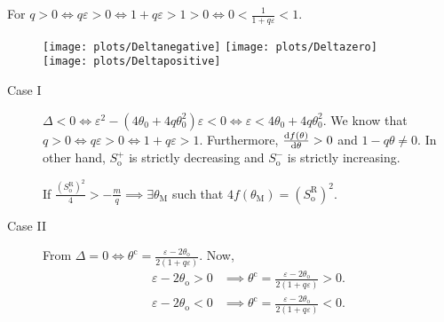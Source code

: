 \documentclass[
    8pt,
    aspectratio=1610,
    c,
    intlimits,
    leqno,
    professionalfonts,
]{beamer}
\begin{document}
\begin{frame}
	For
	\begin{math}
		q>0\iff
		q\varepsilon>0\iff
		1+q\varepsilon>1>0\iff
		0<\frac{1}{1+q\varepsilon}<1
	\end{math}.

	\begin{figure}[ht!]
		\centering
		\texttt{[image: plots/Deltanegative]}
		\texttt{[image: plots/Deltazero]}
		\texttt{[image: plots/Deltapositive]}
	\end{figure}

	\begin{description}
		\item[Case I]
		      \begin{math}
			      \Delta<0\iff
			      \varepsilon^{2}-\left(4\theta_{0}+4q\theta^{2}_{0}\right)\varepsilon<0\iff
			      \varepsilon<4\theta_{0}+4q\theta^{2}_{0}
		      \end{math}.
		      We know that
		      $q>0\iff q\varepsilon>0\iff 1+q\varepsilon>1$.
		      Furthermore, $\diff{f\left(\theta\right)}{\theta}>0$ and $1-q\theta\neq 0$.
		      In other hand, $S^{+}_{\text{o}}$ is strictly decreasing and
		      $S^{-}_{\text{o}}$ is strictly increasing.

		      If $\frac{\left(S^{\text{R}}_{\text{o}}\right)^{2}}{4}>-\frac{m}{q}\implies\exists\theta_{\text{M}}$
		      such that $4f\left(\theta_{\text{M}}\right)=\left(S^{\text{R}}_{\text{o}}\right)^{2}$.

		\item[Case II]

		      From $\Delta=0\iff\theta^{\text{c}}=\frac{\varepsilon-2\theta_{\text{o}}}{2\left(1+q\varepsilon\right)}$.
		      Now,
		      \begin{align*}
			      \varepsilon-2\theta_{\text{o}}>0 & \implies
			      \theta^{\text{c}}=\frac{\varepsilon-2\theta_{\text{o}}}{2\left(1+q\varepsilon\right)}>0. \\
			      \varepsilon-2\theta_{\text{o}}<0 & \implies
			      \theta^{\text{c}}=\frac{\varepsilon-2\theta_{\text{o}}}{2\left(1+q\varepsilon\right)}<0.
		      \end{align*}
	\end{description}
\end{frame}
\end{document}
